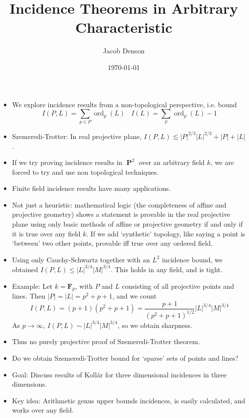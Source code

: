 \documentclass{article}
\title{Incidence Theorems in Arbitrary Characteristic}
\author{Jacob Denson}
\date{\today}
\theoremstyle{plain}
\DeclareMathOperator{\PP}{\mathbf{P}}
\DeclareMathOperator{\ord}{\text{ord}}
\begin{document}
\maketitle

\begin{itemize}
    \item We explore incidence results from a non-topological perspective, i.e. bound
    \[ I(P,L) = \sum_{p \in P} \ord_p(L)\ \ \ \ I(L) = \sum_p \ord_p(L) - 1 \]

    \item Szemeredi-Trotter: In real projective plane, $I(P,L) \lesssim |P|^{2/3} |L|^{2/3} + |P| + |L|$.

    \item If we try proving incidence results in $\PP^2$ over an arbitrary field $k$, we are forced to try and use non topological techniques.

    \item Finite field incidence results have many applications.

    \item Not just a heuristic: mathematical logic (the completeness of affine and projective geometry) shows a statement is provable in the real projective plane using only basic methods of affine or projective geometry if and only if it is true over any field $k$. If we add `synthetic' topology, like saying a point is `between' two other points, provable iff true over any ordered field.

    \item Using only Cauchy-Schwartz together with an $L^2$ incidence bound, we obtained $I(P,L) \leq |L|^{3/4} |M|^{3/4}$. This holds in any field, and is tight.

    \item Example: Let $k = \mathbf{F}_p$, with $P$ and $L$ consisting of all projective points and lines. Then $|P| = |L| = p^2 + p+1$, and we count
    \[ I(P,L) = (p+1)(p^2+p+1) = \frac{p+1}{(p^2 + p + 1)^{1/2}} |L|^{3/4} |M|^{3/4} \]
    As $p \to \infty$, $I(P,L) \sim |L|^{3/4} |M|^{3/4}$, so we obtain sharpness.

    \item Thus no purely projective proof of Szemeredi-Trotter theorem.

    \item Do we obtain Szemeredi-Trotter bound for `sparse' sets of points and lines?

    \item Goal: Discuss results of Koll\'{a}r for three dimensional incidences in three dimensions.

    \item Key idea: Arithmetic genus upper bounds incidences, is easily calculated, and works over any field.
\end{itemize}
\end{document}
